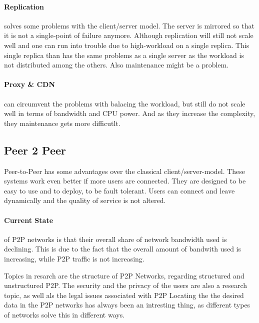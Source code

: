 \paragraph{Replication} %
\label{par:replication}
solves some problems with the client/server model.
The server is mirrored so that it is not a single-point of failure anymore.
Although replication will still not scale well
and one can run into trouble due to high-workload on a single replica.
This single replica than has the same problems as a single server
as the workload is not distributed among the others.
Also maintenance might be a problem.

\paragraph{Proxy \& CDN} %
\label{par:proxy_&_cdn}
can circumvent the problems with balacing the workload,
but still do not scale well in terms of bandwidth and CPU power.
And as they increase the complexity,
they maintenance gets more difficutlt.

\subsection{Peer 2 Peer} %
\label{sub:peer_2_peer}
Peer-to-Peer has some advantages over the classical client/server-model.
These systems work even better if more users are connected.
They are designed to be easy to use and to deploy,
to be fault tolerant.
Users can connect and leave dynamically and the quality of service is not altered.

\paragraph{Current State}
of P2P networks is that their overall share of network bandwidth used is declining.
This is due to the fact that the overall amount of bandwith used is increasing,
while P2P traffic is not increasing.

Topics in resarch are the structure of P2P Networks,
regarding structured and unstructured P2P.
The security and the privacy of the users are also a research topic,
as well als the legal issues associated with P2P
Locating the the desired data in the P2P networks has always been an intresting thing,
as different types of networks solve this in different ways.

